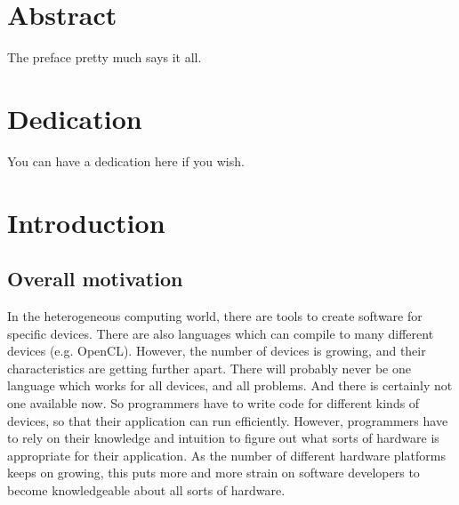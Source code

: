 \documentclass[12pt,twoside]{reedthesis}
\begin{document}
    \tableofcontents
    \listoftables
    \listoffigures

    \chapter*{Abstract}
	The preface pretty much says it all.
	
	\chapter*{Dedication}
	You can have a dedication here if you wish.

  \mainmatter %
  \pagestyle{fancyplain} %





\chapter*{Introduction}
\lstset{language=C++}
	
	\section{Overall motivation}
		
		In the heterogeneous computing world, there are tools to create software for specific devices. There are also languages which can compile to many different devices (e.g. OpenCL). However, the number of devices is growing, and their characteristics are getting further apart. There will probably never be one language which works for all devices, and all problems. And there is certainly not one available now. So programmers have to write code for different kinds of devices, so that their application can run efficiently. However, programmers have to rely on their knowledge and intuition to figure out what sorts of hardware is appropriate for their application. As the number of different hardware platforms keeps on growing, this puts more and more strain on software developers to become knowledgeable about all sorts of hardware.
		
\end{document}
